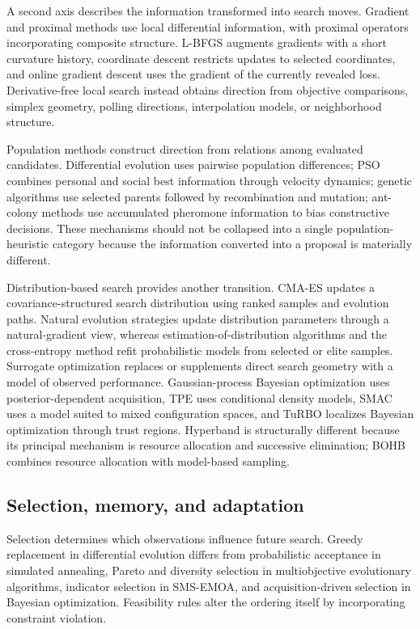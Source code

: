 A second axis describes the information transformed into search moves. Gradient and proximal methods use local differential information, with proximal operators incorporating composite structure. L-BFGS augments gradients with a short curvature history, coordinate descent restricts updates to selected coordinates, and online gradient descent uses the gradient of the currently revealed loss. Derivative-free local search instead obtains direction from objective comparisons, simplex geometry, polling directions, interpolation models, or neighborhood structure.

Population methods construct direction from relations among evaluated candidates. Differential evolution uses pairwise population differences; PSO combines personal and social best information through velocity dynamics; genetic algorithms use selected parents followed by recombination and mutation; ant-colony methods use accumulated pheromone information to bias constructive decisions. These mechanisms should not be collapsed into a single population-heuristic category because the information converted into a proposal is materially different.

Distribution-based search provides another transition. CMA-ES updates a covariance-structured search distribution using ranked samples and evolution paths. Natural evolution strategies update distribution parameters through a natural-gradient view, whereas estimation-of-distribution algorithms and the cross-entropy method refit probabilistic models from selected or elite samples. Surrogate optimization replaces or supplements direct search geometry with a model of observed performance. Gaussian-process Bayesian optimization uses posterior-dependent acquisition, TPE uses conditional density models, SMAC uses a model suited to mixed configuration spaces, and TuRBO localizes Bayesian optimization through trust regions. Hyperband is structurally different because its principal mechanism is resource allocation and successive elimination; BOHB combines resource allocation with model-based sampling.

\subsection{Selection, memory, and adaptation}

Selection determines which observations influence future search. Greedy replacement in differential evolution differs from probabilistic acceptance in simulated annealing, Pareto and diversity selection in multiobjective evolutionary algorithms, indicator selection in SMS-EMOA, and acquisition-driven selection in Bayesian optimization. Feasibility rules alter the ordering itself by incorporating constraint violation.

